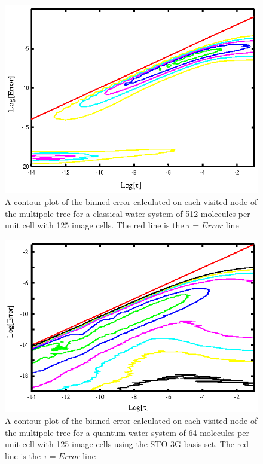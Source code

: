 \documentclass[prb,aps,nobibnotes,twocolumn,doublespace,twocolumngrid,superbib]{revtex4}
\begin{document}
%
%
\begin{figure}
\caption{A contour plot of the binned error calculated on each visited node of the multipole tree for a
classical water system of 512 molecules per unit cell with 125 image cells. 
The red line is the $\tau=Error$ line}
{\centering \includegraphics {Error_vs_TauMAC_bin_Water512.ps} \par} 
\label{figure:MultipoleErrorWaterC512} 
\end{figure}
%
%
\begin{figure}
\caption{A contour plot of the binned error calculated on each visited node of the multipole tree for a 
quantum  water system of 64 molecules per unit cell with 125 image cells using the STO-3G basis set.
The red line is the $\tau=Error$ line}
{\centering \includegraphics{Error_vs_TauMAC_Water64_bin.ps} \par} 
\label{figure:MultipoleErrorWaterQ64} 
\end{figure}
\end{document}
